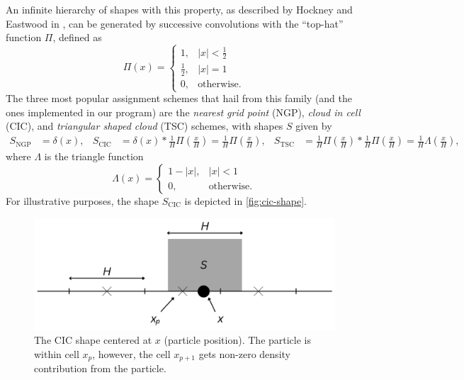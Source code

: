An infinite hierarchy of shapes with this property, as described by Hockney and Eastwood in \cite{Hockney1988}, can be generated by successive convolutions with the ``top-hat'' function $\Pi$, defined as
\begin{equation*}
    \Pi(x) = \begin{cases}
        1,           & |x| < \frac{1}{2} \\
        \frac{1}{2}, & |x| = 1           \\
        0,           & \text{otherwise}.
    \end{cases}
\end{equation*}
The three most popular assignment schemes that hail from this family (and the ones implemented in our program) are the \textit{nearest grid point} (NGP), \textit{cloud in cell} (CIC), and \textit{triangular shaped cloud} (TSC) schemes, with shapes $S$ given by
\begin{align*}
    S_\text{NGP} & = \delta(x), & S_\text{CIC} & = \delta(x) * \frac{1}{H} \Pi\left(\frac{x}{H}\right) = \frac{1}{H}\Pi\left(\frac{x}{H}\right), & S_\text{TSC} & = \frac{1}{H}\Pi\left(\frac{x}{H}\right) * \frac{1}{H}\Pi\left(\frac{x}{H}\right) = \frac{1}{H}\Lambda \left(\frac{x}{H}\right),
\end{align*}
where $\Lambda$ is the triangle function
\begin{equation*}
    \Lambda(x) = \begin{cases}
        1 - |x|, & |x| < 1           \\
        0,       & \text{otherwise}.
    \end{cases}
\end{equation*}
For illustrative purposes, the shape $S_\text{CIC}$ is depicted in \autoref{fig:cic-shape}.
\begin{figure}[htp]
    \centering
    \includegraphics[scale=0.2]{img/CIC.png}
    \caption{The CIC shape centered at $x$ (particle position).
        The particle is within cell $x_p$, however, the cell $x_{p+1}$ gets non-zero density contribution from the particle.}
    \label{fig:cic-shape}
\end{figure}

